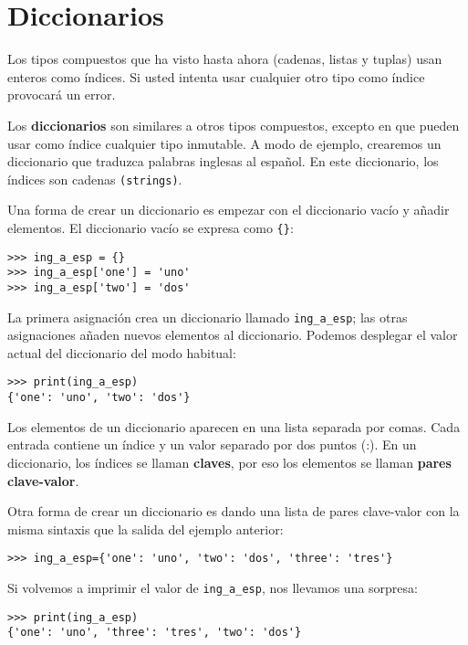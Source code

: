 
\chapter{Diccionarios}

  
  

Los tipos compuestos que ha visto hasta ahora (cadenas, listas y tuplas)
usan enteros como índices. Si usted intenta usar cualquier otro tipo
como índice provocará un error.

Los \textbf{diccionarios} son similares a otros tipos compuestos,
excepto en que pueden usar como índice cualquier tipo inmutable. A
modo de ejemplo, crearemos un diccionario que traduzca palabras inglesas
al español. En este diccionario, los índices son cadenas \texttt{(strings)}.

Una forma de crear un diccionario es empezar con el diccionario vacío
y añadir elementos. El diccionario vacío se expresa como \texttt{\{\}}:
\begin{lstlisting}
>>> ing_a_esp = {}
>>> ing_a_esp['one'] = 'uno'
>>> ing_a_esp['two'] = 'dos'
\end{lstlisting}

La primera asignación crea un diccionario llamado \texttt{ing\_a\_esp};
las otras asignaciones añaden nuevos elementos al diccionario. Podemos
desplegar el valor actual del diccionario del modo habitual:
\begin{lstlisting}
>>> print(ing_a_esp)
{'one': 'uno', 'two': 'dos'}
\end{lstlisting}

Los elementos de un diccionario aparecen en una lista separada por
comas. Cada entrada contiene un índice y un valor separado por dos
puntos (:). En un diccionario, los índices se llaman \textbf{claves},
por eso los elementos se llaman \textbf{pares clave-valor}.

Otra forma de crear un diccionario es dando una lista de pares clave-valor
con la misma sintaxis que la salida del ejemplo anterior:
\begin{lstlisting}
>>> ing_a_esp={'one': 'uno', 'two': 'dos', 'three': 'tres'}
\end{lstlisting}

Si volvemos a imprimir el valor de \texttt{ing\_a\_esp}, nos llevamos
una sorpresa:
\begin{lstlisting}
>>> print(ing_a_esp)
{'one': 'uno', 'three': 'tres', 'two': 'dos'}
\end{lstlisting}

